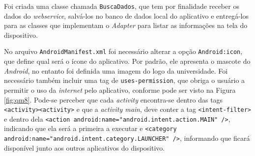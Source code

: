 		
	\par Foi criada uma classe chamada \texttt{BuscaDados}, que tem por finalidade
receber os dados do \textit{webservice}, salvá-los no banco de dados local do
aplicativo e entregá-los para as classes que implementam o \textit{Adapter}
para listar as informações na tela do dispositivo.
	
	\par No arquivo \texttt{AndroidManifest.xml} foi necessário alterar a opção
\texttt{Android:icon}, que define qual será o ícone do aplicativo. Por padrão,
ele apresenta o mascote do \textit{Android}, no entanto foi definida uma imagem
do logo da universidade. Foi necessário também incluir uma tag de
\texttt{uses-permission}, que obriga o usuário a permitir o uso da
\textit{internet} pelo aplicativo, conforme pode ser visto na Figura
\ref{fig:qm8}. Pode-se perceber que cada \textit{activity} encontra-se
dentro das tags \texttt{<activity><\/activity>} e que a \textit{activity main},
deve conter a tag \texttt{<intent-filter>} e dentro dela {\tiny{\texttt{<action
android:name="android.intent.action.MAIN" />}}}, indicando que
ela será a primeira a executar e {\tiny{\texttt{<category
android:name="android.intent.category.LAUNCHER" />}}}, informando que ficará
disponível junto aos outros aplicativos do dispositivo.
	
